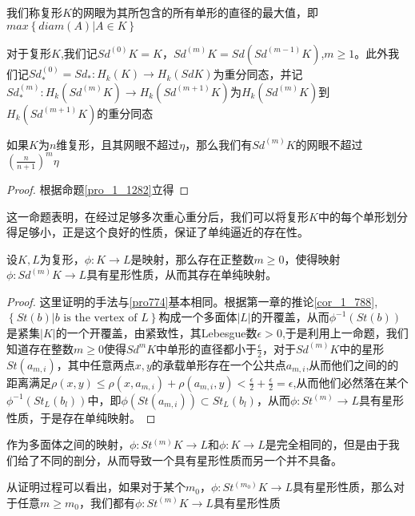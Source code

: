 \begin{definition}
我们称复形$K$的网眼为其所包含的所有单形的直径的最大值，即$max\left\{diam(A)|A\in K\right\}$
\end{definition}
\begin{definition}
对于复形$K$,我们记$Sd^{(0)}K=K$，$Sd^{(m)}K=Sd(Sd^{(m-1)}K)$,$m\geq 1$。此外我们记$Sd^{(0)}_{*}=Sd_{*}:H_{k}(K)\rightarrow H_{k}(SdK)$为重分同态，并记$Sd^{(m)}_{*}:H_{k}(Sd^{(m)}K)\rightarrow H_{k}(Sd^{(m+1)}K)$为$H_{k}(Sd^{(m)}K)$到$H_{k}(Sd^{(m+1)}K)$的重分同态
\end{definition}
\begin{proposition}
如果$K$为$n$维复形，且其网眼不超过$\eta$，那么我们有$Sd^{(m)}K$的网眼不超过$\left(\frac{n}{n+1}\right)^{m}\eta$
\end{proposition}
\begin{proof}
根据命题\eqref{pro_1_1282}立得
\end{proof}
这一命题表明，在经过足够多次重心重分后，我们可以将复形$K$中的每个单形划分得足够小，正是这个良好的性质，保证了单纯逼近的存在性。
\begin{proposition}[单纯映射存在性定理]
设$K,L$为复形，$\phi:K\rightarrow L$是映射，那么存在正整数$m\geq 0$，使得映射$\phi:Sd^{(m)}K\rightarrow L$具有星形性质，从而其存在单纯映射。
\end{proposition}
\begin{proof}
这里证明的手法与\eqref{pro774}基本相同。根据第一章的推论\eqref{cor_1_788},$\left\{St(b)|b\text{ is the vertex of } L\right\}$构成一个多面体$|L|$的开覆盖，从而$\phi^{-1}(St(b))$是紧集$|K|$的一个开覆盖，由紧致性，其Lebesgue数$\epsilon>0$,于是利用上一命题，我们知道存在整数$m\geq0$使得$Sd^{m}K$中单形的直径都小于$\frac{\epsilon}{2}$，对于$Sd^{(m)}K$中的星形$St(a_{m,i})$，其中任意两点$x,y$的承载单形存在一个公共点$a_{m,i}$,从而他们之间的的距离满足$\rho(x,y)\leq \rho(x,a_{m,i})+\rho(a_{m,i},y)< \frac{\epsilon}{2}+\frac{\epsilon}{2}=\epsilon$,从而他们必然落在某个$\phi^{-1}(St_{L}(b_{l}))$中，即$\phi(St(a_{m,i}))\subset St_{L}(b_{l})$，从而$\phi:St^{(m)}\rightarrow L$具有星形性质，于是存在单纯映射。
\end{proof}
\begin{remark}
作为多面体之间的映射，$\phi:St^{(m)}K\rightarrow L$和$\phi:K\rightarrow L$是完全相同的，但是由于我们给了不同的剖分，从而导致一个具有星形性质而另一个并不具备。
\end{remark}
\begin{remark}
从证明过程可以看出，如果对于某个$m_{0}$，$\phi:St^{(m_{0})}K\rightarrow L$具有星形性质，那么对于任意$m\geq m_{0}$，我们都有$\phi:St^{(m)}K\rightarrow L$具有星形性质
\end{remark}
